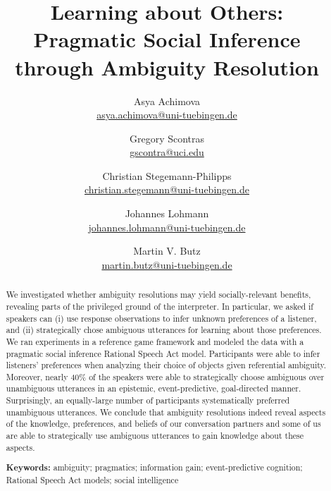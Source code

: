 \documentclass[10pt,a4paper]{article}
\title{Learning about Others:\\
	Pragmatic Social Inference \\ through Ambiguity Resolution
}
\author{
		Asya Achimova\\
		\href{mailto:asya.achimova@uni-tuebingen.de}{asya.achimova@uni-tuebingen.de}
	\and
		Gregory Scontras\\
		\href{mailto:gscontra@uci.edu}{gscontra@uci.edu}
	\and 
		Christian Stegemann-Philipps\\
		\href{mailto:christian.stegemann@uni-tuebingen.de}{christian.stegemann@uni-tuebingen.de}
	\and
		Johannes Lohmann\\
		\href{mailto:johannes.lohmann@uni-tuebingen.de}{johannes.lohmann@uni-tuebingen.de}
	\and
		Martin V. Butz \\
		\href{mailto:martin.butz@uni-tuebingen.de}{martin.butz@uni-tuebingen.de}
}
\begin{document}
\maketitle

\begin{abstract}
We investigated whether ambiguity resolutions may yield socially-relevant benefits,
revealing parts of the privileged ground of the interpreter. 
In particular, we asked if speakers can (i) use response observations to infer unknown preferences of a listener, and (ii) strategically chose ambiguous utterances for learning about those preferences. 
We ran experiments in a reference game framework and modeled the data with a pragmatic social inference Rational Speech Act model.
Participants were able to infer listeners' preferences when analyzing their choice of objects given referential ambiguity.
Moreover, nearly 40\% of the speakers were able to strategically choose ambiguous over unambiguous utterances in an epistemic, event-predictive, goal-directed manner.
Surprisingly, an equally-large number of participants systematically preferred unambiguous utterances. 
We conclude that ambiguity resolutions indeed reveal aspects of the knowledge, preferences, and beliefs of our conversation partners and some of us are able to strategically use ambiguous utterances to gain knowledge about these aspects.

\textbf{Keywords:} 
ambiguity; pragmatics; information gain; event-predictive cognition; Rational Speech Act models; social intelligence
\end{abstract}
\end{document}
